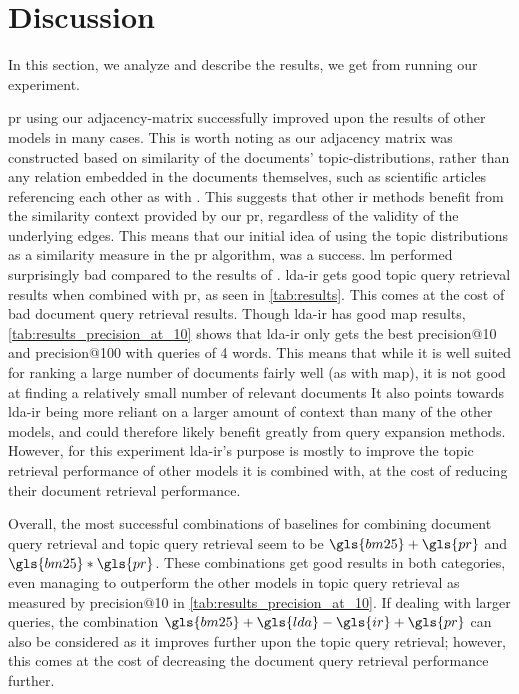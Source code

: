 \section{Discussion}\label{sec:discussion}
In this section, we analyze and describe the results, we get from running our experiment.

\gls{pr} using our adjacency-matrix successfully improved upon the results of other models in many cases.
This is worth noting as our adjacency matrix was constructed based on similarity of the documents' topic-distributions, rather than any relation embedded in the documents themselves, such as scientific articles referencing each other as with \citeauthor{yang2009topic}\cite{yang2009topic}.
This suggests that other \gls{ir} methods benefit from the similarity context provided by our \gls{pr}, regardless of the validity of the underlying edges.
This means that our initial idea of using the topic distributions as a similarity measure in the \gls{pr} algorithm, was a success.
\gls{lm} performed surprisingly bad compared to the results of \cite{yang2009topic}. 
\gls{lda}-\gls{ir} gets good topic query retrieval results when combined with \gls{pr}, as seen in \autoref{tab:results}.
This comes at the cost of bad document query retrieval results.
Though \gls{lda}-\gls{ir} has good \gls{map} results, \autoref{tab:results_precision_at_10} shows that \gls{lda}-\gls{ir} only gets the best precision@10 and precision@100 with queries of 4 words.
This means that while it is well suited for ranking a large number of documents fairly well (as with \gls{map}), it is not good at finding a relatively small number of relevant documents
It also points towards \gls{lda}-\gls{ir} being more reliant on a larger amount of context than many of the other models, and could therefore likely benefit greatly from query expansion methods.
However, for this experiment \gls{lda}-\gls{ir}'s purpose is mostly to improve the topic retrieval performance of other models it is combined with, at the cost of reducing their document retrieval performance.

Overall, the most successful combinations of baselines for combining document query retrieval and topic query retrieval seem to be $\gls{bm25}+\gls{pr}$ and $\gls{bm25}*\gls{pr}$.
These combinations get good results in both categories, even managing to outperform the other models in topic query retrieval as measured by precision@10 in \autoref{tab:results_precision_at_10}.
If dealing with larger queries, the combination $\gls{bm25}+\gls{lda}-\gls{ir}+\gls{pr}$ can also be considered as it improves further upon the topic query retrieval; however, this comes at the cost of decreasing the document query retrieval performance further.
